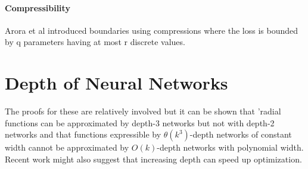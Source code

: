 \paragraph{Compressibility}
Arora et al introduced boundaries using compressions where the loss is bounded by q parameters having at most r discrete values. 
\section{Depth of Neural Networks}
The proofs for these are relatively involved but it can be shown that 'radial functions can be approximated by depth-3 networks but not with depth-2 networks and that functions expressible by $\theta(k^3)$-depth networks of constant width cannot be approximated by $O(k)$-depth networks with polynomial width. Recent work might also suggest that increasing depth can speed up optimization.



